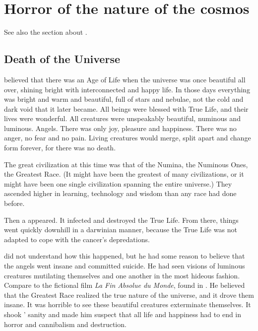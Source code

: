 \section{Horror of the nature of the cosmos}
See also the section about . 









\subsection{Death of the Universe}
%
%
\Sethicus believed that there was an Age of Life when the universe was once beautiful all over, shining bright with interconnected and happy life. 
In those days everything was bright and warm and beautiful, full of stars and nebulae, not the cold and dark void that it later became. 
All beings were blessed with True Life, and their lives were wonderful. 
All creatures were unspeakably beautiful, numinous and luminous. 
Angels.
There was only joy, pleasure and happiness. 
There was no anger, no fear and no pain. 
Living creatures would merge, split apart and change form forever, for there was no death. 

%
%
The great civilization at this time was that of the Numina, the Numinous Ones, the Greatest Race. 
(It might have been the greatest of many civilizations, or it might have been one single civilization spanning the entire universe.)
They ascended higher in learning, technology and wisdom than any race had done before. 

Then a  appeared. 
It infected and destroyed the True Life. 
From there, things went quickly downhill in a darwinian manner, because the True Life was not adapted to cope with the cancer's depredations. 

\Sethicus did not understand how this happened, but he had some reason to believe that the angels went insane and committed suicide.
He had seen visions of luminous creatures mutilating themselves and one another in the most hideous fashion. 
Compare to the fictional film \emph{La Fin Absolue du Monde}, found in \cite{Movie:CigaretteBurns}.
He believed that the Greatest Race realized the true nature of the universe, and it drove them insane. 
It was horrible to see these beautiful creatures exterminate themselves. 
It shook \Sethicus' sanity and made him suspect that all life and happiness had to end in horror and cannibalism and destruction. 


